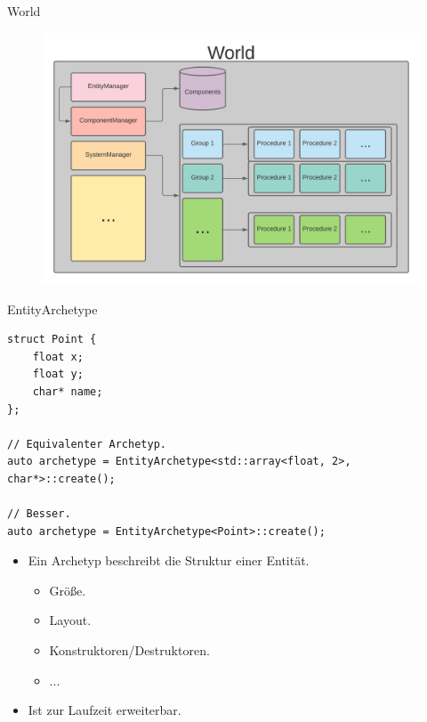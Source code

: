 \documentclass{presentation}
\begin{document}
\begin{frame}{World}
    \begin{figure}
        \includegraphics[scale=0.5]{world_structure.jpg}
    \end{figure}
\end{frame}

\begin{frame}[fragile]{EntityArchetype}
    \begin{lstlisting}[style=context]
struct Point {
    float x;
    float y;
    char* name;
};

// Equivalenter Archetyp.
auto archetype = EntityArchetype<std::array<float, 2>, char*>::create();

// Besser.
auto archetype = EntityArchetype<Point>::create();
    \end{lstlisting}

    \begin{itemize}
        \item Ein Archetyp beschreibt die Struktur einer Entität.
        \begin{itemize}
            \item Größe.
            \item Layout.
            \item Konstruktoren/Destruktoren.
            \item ...
        \end{itemize}
        \item Ist zur Laufzeit erweiterbar.
    \end{itemize}
\end{frame}
\end{document}
